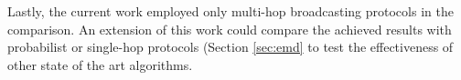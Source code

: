 		
		Lastly, the current work employed only multi-hop broadcasting protocols in the comparison. An extension of this work could compare the achieved results with probabilist or single-hop protocols (Section \ref{sec:emd} to test the effectiveness of other state of the art algorithms.
		
		
%
%
